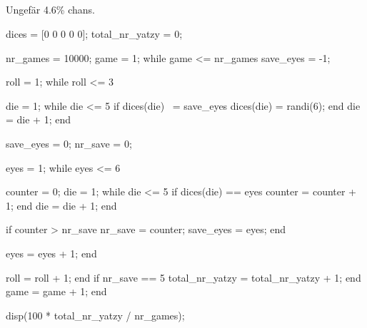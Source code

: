 
\subsection*{}
Ungefär 4.6\% chans.
\vspace{10pt}
\begin{matlab}
dices = [0 0 0 0 0]; %
total_nr_yatzy = 0; %

nr_games = 10000; %
game = 1;
while game <= nr_games
  save_eyes = -1;

  roll = 1;
  while roll <= 3

    die = 1;
    while die <= 5
      if dices(die) ~= save_eyes
        dices(die) = randi(6);
      end
      die = die + 1; %
    end


    save_eyes = 0; %
    nr_save = 0; %

    eyes = 1;
    while eyes <= 6

      counter = 0;
      die = 1;
      while die <= 5
        if dices(die) == eyes
          counter = counter + 1;
        end
        die = die + 1;
      end

      if counter > nr_save
        nr_save = counter;
        save_eyes = eyes;
      end

      eyes = eyes + 1;
    end

    roll = roll + 1; %
  end
  if nr_save == 5 %
    total_nr_yatzy = total_nr_yatzy + 1;
  end
  game = game + 1; %
end

disp(100 * total_nr_yatzy / nr_games);
\end{matlab}

